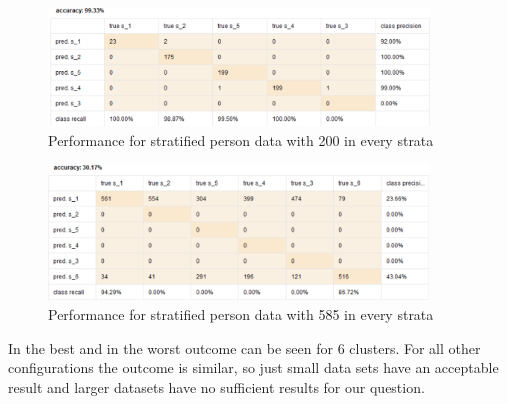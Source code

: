 \begin{figure}[H]
\vspace*{-1em}
\centering
\includegraphics[width = 0.9\textwidth]{Dec200eqPrec.PNG}
\caption{Performance for stratified person data with 200 in every strata}
\label{fig:DecVec200}
\end{figure}
\vspace*{-3em}
\begin{figure}[H]
\centering
\includegraphics[width= 0.9\textwidth]{decvec585pre.PNG}
\caption{Performance for stratified person data with 585 in every strata}
\label{fig:DecVec585}
\end{figure}
\vspace*{-1em}

In  the best and in  the worst outcome can be seen for 6 clusters. For all other configurations the outcome is similar, so just small data sets have an acceptable result and larger datasets have no sufficient results for our question.\\